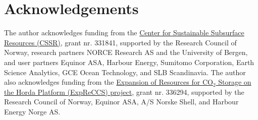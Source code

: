 \documentclass[11pt]{article}
\begin{document}
\section*{Acknowledgements}
The author acknowledges funding from the \href{https://cssr.no}{Center for Sustainable Subsurface Resources (CSSR)}, grant nr. 331841, supported by the Research Council of Norway, research partners NORCE Research AS and the University of Bergen, and user partners Equinor ASA, Harbour Energy, Sumitomo Corporation, Earth Science Analytics, GCE Ocean Technology, and SLB Scandinavia. The author also acknowledges funding from the \href{https://www.norceresearch.no/en/projects/expansion-of-resources-for-co2-storage-on-the-horda-platform-expreccs}{Expansion of Resources for CO$_2$ Storage on the Horda Platform (ExpReCCS) project}, grant nr. 336294, supported by the Research Council of Norway, Equinor ASA, A/S Norske Shell, and Harbour Energy Norge AS.


\end{document}

